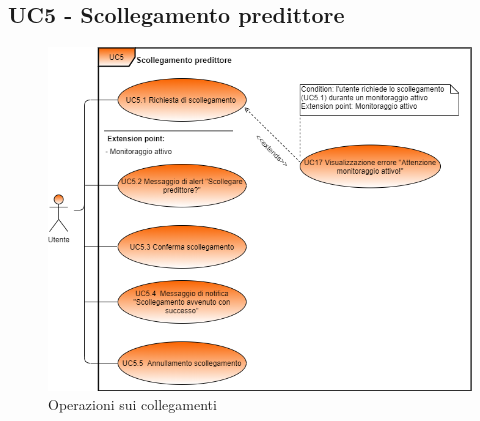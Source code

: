 
\label{par:UC5}
	\subsection{UC5 - Scollegamento predittore}
	
	
	\begin{figure}[H]
		\centering
		\includegraphics[scale=0.70]{../Analisi_dei_requisiti/img/Diagrammi_UML/UC5_scollegamento_predittore.png}
		\caption{Operazioni sui collegamenti} 
		\end{figure}	

